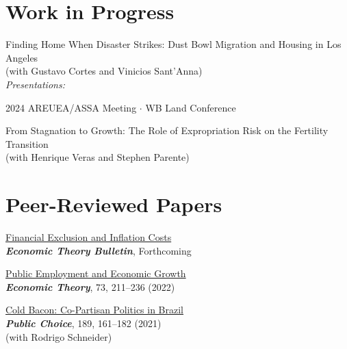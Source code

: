 \documentclass[mm, 10pt]{simple_style}
\begin{document}
\begin{resume}
\section{Work in Progress}

Finding Home When Disaster Strikes: Dust Bowl Migration and Housing in Los Angeles \\
(with Gustavo Cortes and Vinicios Sant'Anna) \\
\textit{Presentations:} 
\begin{minipage}[t]{0.7\textwidth}
2024 AREUEA/ASSA Meeting
$\cdot$ {\color{gray} WB Land Conference}
\end{minipage}

From Stagnation to Growth: The Role of Expropriation Risk on the Fertility Transition\\
(with Henrique Veras and Stephen Parente)



\section{Peer-Reviewed Papers}
\href{https://www.usf.edu/arts-sciences/departments/economics/documents/wpaper/2023-01.pdf}{Financial Exclusion and Inflation Costs}\\
\textbf{\textit{Economic Theory Bulletin}}, Forthcoming 



\href{https://doi.org/10.1007/s00199-020-01333-6}{Public Employment and Economic Growth}\\
\textbf{\textit{Economic Theory}}, 73, 211–236 (2022)  

\href{https://doi.org/10.1007/s11127-020-00869-4}{Cold Bacon: Co-Partisan Politics in Brazil} \\
\textbf{\textit{Public Choice}}, 189, 161–182 (2021) \\
(with Rodrigo Schneider) 


\end{resume}
\end{document}
